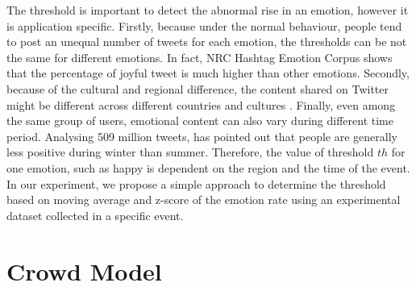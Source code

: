 The threshold is important to detect the abnormal rise in an emotion, however it is application specific. Firstly, because under the normal behaviour, people tend to post an unequal number of tweets for each emotion, the thresholds can be not the same for different emotions. In fact, NRC Hashtag Emotion Corpus \citep{mohammad2014using} shows that the percentage of joyful tweet is much higher than other emotions. Secondly, because of the cultural and regional difference, the content shared on Twitter might be different across different countries and cultures \citep{Larsen2015}. Finally, even among the same group of users, emotional content can also vary during different time period. Analysing 509 million tweets, \citet{Golder30092011} has pointed out that people are generally less positive during winter than summer. Therefore, the value of threshold \(th\) for one emotion, such as happy is dependent on the region and the time of the event. In our experiment, we propose a simple approach to determine the threshold based on moving average and z-score of the emotion rate using an experimental dataset collected in a specific event.

\section{Crowd Model}

